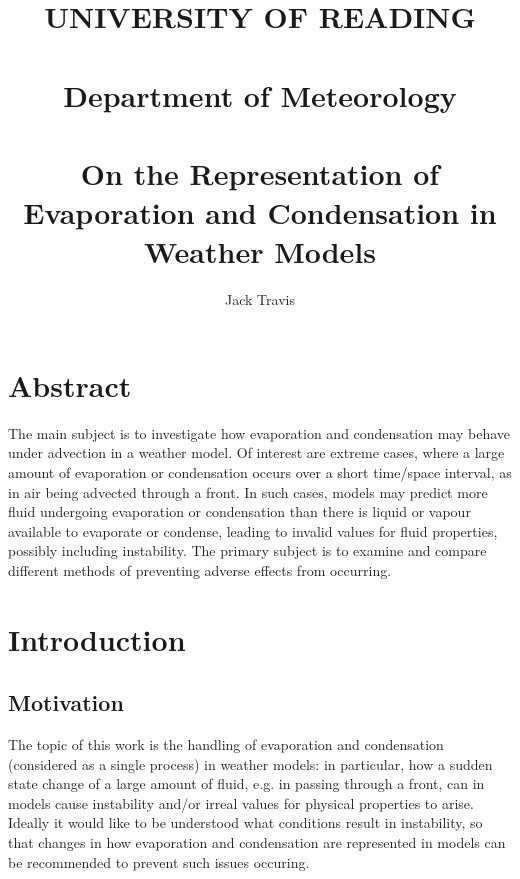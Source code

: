 \documentclass[11pt]{article}
\begin{document}
\thispagestyle{empty}
\title{UNIVERSITY OF READING\\
~\\
Department of Meteorology\\
~\\
On the Representation of Evaporation and Condensation in Weather Models}
\author{Jack Travis}
\maketitle

\section{Abstract}
The main subject is to investigate how evaporation and condensation may behave under advection in a weather model. Of interest are extreme cases, where a large amount of evaporation or condensation occurs over a short time/space interval, as in air being advected through a front. In such cases, models may predict more fluid undergoing evaporation or condensation than there is liquid or vapour available to evaporate or condense, leading to invalid values for fluid properties, possibly including instability. The primary subject is to examine and compare different methods of preventing adverse effects from occurring.

\null \vfill {}

\newpage

\tableofcontents

\newpage

\section{Introduction}
\subsection{Motivation}
The topic of this work is the handling of evaporation and condensation (considered as a single process) in weather models: in particular, how a sudden state change of a large amount of fluid, e.g. in passing through a front, can in models cause instability and/or irreal values for physical properties to arise. \\
Ideally it would like to be understood what conditions result in instability, so that changes in how evaporation and condensation are represented in models can be recommended to prevent such issues occuring.
\end{document}

